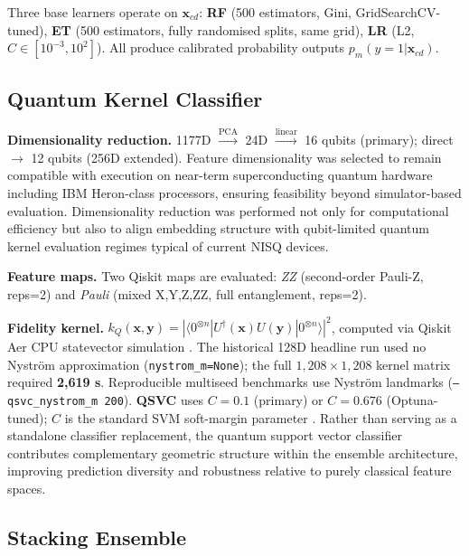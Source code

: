 Three base learners operate on $\mathbf{x}_{cd}$:
\textbf{RF} (500 estimators, Gini, GridSearchCV-tuned),
\textbf{ET} (500 estimators, fully randomised splits, same grid),
\textbf{LR} (L2, $C\in[10^{-3},10^2]$).
All produce calibrated probability outputs $p_m(y=1|\mathbf{x}_{cd})$.
\fi

\subsection{Quantum Kernel Classifier}

\textbf{Dimensionality reduction.} 1177D $\xrightarrow{\text{PCA}}$ 24D
$\xrightarrow{\text{linear}}$ 16 qubits (primary); direct $\to$ 12 qubits
(256D extended). Feature dimensionality was selected to remain compatible
with execution on near-term superconducting quantum hardware including IBM
Heron-class processors, ensuring feasibility beyond simulator-based
evaluation. Dimensionality reduction was performed not only for computational
efficiency but also to align embedding structure with qubit-limited quantum
kernel evaluation regimes typical of current NISQ devices.

\textbf{Feature maps.} Two Qiskit \cite{qiskit2023} maps are evaluated:
\emph{ZZ} (second-order Pauli-Z, reps=2) and
\emph{Pauli} (mixed X,Y,Z,ZZ, full entanglement, reps=2).

\textbf{Fidelity kernel.}
$k_Q(\mathbf{x},\mathbf{y})=|\langle 0^{\otimes n}|U^\dagger(\mathbf{x})U(\mathbf{y})|0^{\otimes n}\rangle|^2$,
computed via Qiskit Aer CPU statevector simulation \cite{qiskit_aer2023}.
The historical 128D headline run used no Nystr\"{o}m approximation
\cite{williams2001nystrom,qiskit_ml2023} (\texttt{nystrom\_m=None}); the full
$1{,}208\!\times\!1{,}208$ kernel matrix required \textbf{2,619 s}.
Reproducible multiseed benchmarks use Nystr\"{o}m landmarks
(\texttt{--qsvc\_nystrom\_m 200}).
\textbf{QSVC} uses $C\!=\!0.1$ (primary) or $C\!=\!0.676$ (Optuna-tuned);
$C$ is the standard SVM soft-margin parameter \cite{qiskit_ml2023}.
Rather than serving as a standalone classifier replacement, the quantum support
vector classifier contributes complementary geometric structure within the
ensemble architecture, improving prediction diversity and robustness relative
to purely classical feature spaces.

\subsection{Stacking Ensemble}

